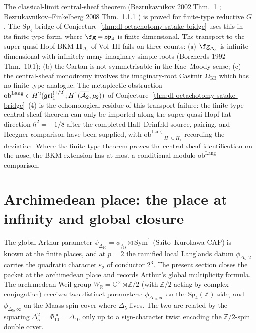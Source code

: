 \begin{remark}
\label{rem:dl-gaitsgory-nadler-bkm-obstruction}
%
%
The classical-limit central-sheaf theorem
(Bezrukavnikov 2002 Thm.~1
\cite{Bezrukavnikov2002}; Bezrukavnikov--Finkelberg 2008 Thm.~1.1.1
\cite{BezrukavnikovFinkelberg2008}) is proved for finite-type
reductive $G$. The $\mathrm{Sp}_4$-bridge of
Conjecture~\ref{thm:dl-octachotomy-satake-bridge} uses this in its
finite-type form, where $\fg=\mathfrak{sp}_4$ is finite-dimensional.
The transport to the super-quasi-Hopf BKM
$\mathbf{H}_{\Delta_5}$ of Vol~III fails on three counts:
(a) $\fg_{\Delta_5}$ is infinite-dimensional with infinitely many
imaginary simple roots (Borcherds 1992 Thm.~10.1);
(b) the Cartan is not symmetrisable in the Kac--Moody sense;
(c) the central-sheaf monodromy involves the imaginary-root
Casimir $\Omega_{\mathrm{K3}}$ which has no finite-type analogue.
The metaplectic obstruction
$\mathrm{ob}^{\mathrm{Lang}}\in
H^2(\mathfrak{grt}_1^{(1/2)};H^1(\overline{\mathcal{A}_2},\mu_2))$
of Conjecture~\ref{thm:dl-octachotomy-satake-bridge}~(4) is the
cohomological residue of this transport failure: the
finite-type central-sheaf theorem can only be imported along the
super-quasi-Hopf flat direction $\hbar^2=-1/8$ after the completed
Hall--Drinfeld source, pairing, and Heegner comparison have been
supplied, with
$\mathrm{ob}^{\mathrm{Lang}}|_{H_1\cup H_4}$ recording the
deviation. Where the finite-type theorem proves the central-sheaf
identification on the nose, the BKM extension has at most a
conditional modulo-$\mathrm{ob}^{\mathrm{Lang}}$ comparison.
\end{remark}

\section{Archimedean place: the place at infinity and global closure}
\label{sec:dl-archimedean}

The global Arthur parameter
$\psi_{\Delta_{10}} = \phi_{f_{18}} \boxtimes \mathrm{Sym}^1$
(Saito--Kurokawa CAP) is known at the finite places, and at $p = 2$
the ramified local Langlands datum $\phi_{\Delta_5, 2}$ carries the
quadratic character $\varepsilon_2$ of conductor $2^3$. The present
section closes the packet at the archimedean place and records
Arthur's global multiplicity
formula. The archimedean Weil group $W_{\mathbb{R}} = \mathbb{C}^\times
\rtimes \mathbb{Z}/2$ (with $\mathbb{Z}/2$ acting by complex
conjugation) receives two distinct parameters: $\phi_{\Delta_{10},
\infty}$ on the $\mathrm{Sp}_4(\mathbb{Z})$ side, and
$\phi_{\Delta_5, \infty}$ on the Maass spin cover where $\Delta_5$
lives. The two are related by the squaring
$\Delta_5^2=\Phi_{10}^{\mathrm{un}}=\Delta_{10}$
only up to a sign-character twist encoding the $\mathbb{Z}/2$-spin
double cover.


